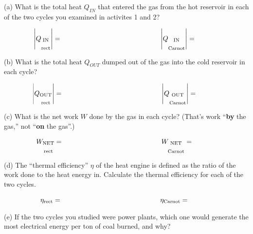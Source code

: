 (a)  What is the total heat $Q_{IN}$ that entered the gas from the hot reservoir in each of the two cycles you examined in activites 1 and 2?

\begin{displaymath}
\hspace{-0.5in} \left| Q_{\substack{\textrm{IN} \\ \\ \textrm{rect}}} \right| =
\hspace{2in} \left| Q_{\substack{\textrm{IN} \\ \\ \textrm{Carnot}}} \right|=
\end{displaymath}

(b) What is the total heat $Q_{OUT}$ dumped out of the gas into the cold reservoir in each cycle?

\begin{displaymath}
\hspace{-0.5in} \left| Q_{\substack{\textrm{OUT} \\ \\ \textrm{rect}}} \right| =
\hspace{2in} \left| Q_{\substack{\textrm{OUT} \\ \\ \textrm{Carnot}}} \right|=
\end{displaymath}

(c)  What is the net work $W$ done by the gas in each cycle?  (That's work ``\textbf{by} the gas,'' not ``\textbf{on} the gas''.) 

\begin{displaymath}
\hspace{-0.5in} W_{\substack{\textrm{NET} \\ \\ \textrm{rect}}} =
\hspace{2in} W_{\substack{\textrm{NET} \\ \\ \textrm{Carnot}}} =
\end{displaymath}

(d)  The ``thermal efficiency'' $\eta$ of the heat engine is defined as the ratio of the work done to the heat energy in.  Calculate the thermal efficiency for each of the two cycles.

\begin{displaymath}
\hspace{-0.5in} \eta_{\rm rect} =
\hspace{2in} \eta_{\rm Carnot} =
\end{displaymath}

\bigskip

(e) If the two cycles you studied were power plants, which one would generate the most electrical energy per ton of coal burned, and why?






